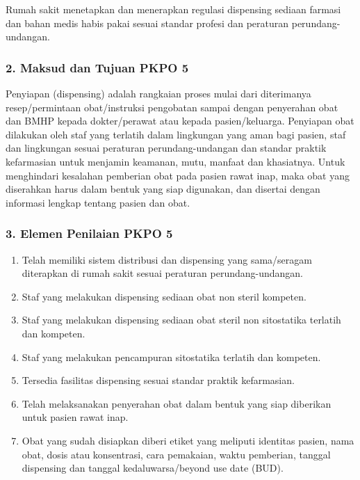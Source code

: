 \documentclass[
]{book}
\providecommand{\tightlist}{%
  \setlength{\itemsep}{0pt}\setlength{\parskip}{0pt}}
\begin{document}
Rumah sakit menetapkan dan menerapkan regulasi dispensing sediaan farmasi dan bahan medis habis pakai sesuai standar profesi dan peraturan perundang-undangan.

\hypertarget{maksud-dan-tujuan-pkpo-5}{%
\subsubsection*{2. Maksud dan Tujuan PKPO 5}\label{maksud-dan-tujuan-pkpo-5}}

Penyiapan (dispensing) adalah rangkaian proses mulai dari diterimanya resep/permintaan obat/instruksi pengobatan sampai dengan penyerahan obat dan BMHP kepada dokter/perawat atau kepada pasien/keluarga. Penyiapan obat dilakukan oleh staf yang terlatih dalam lingkungan yang aman bagi pasien, staf dan lingkungan sesuai peraturan perundang-undangan dan standar praktik kefarmasian untuk menjamin keamanan, mutu, manfaat dan khasiatnya. Untuk menghindari kesalahan pemberian obat pada pasien rawat inap, maka obat yang diserahkan harus dalam bentuk yang siap digunakan, dan disertai dengan informasi lengkap tentang pasien dan obat.

\hypertarget{elemen-penilaian-pkpo-5}{%
\subsubsection*{3. Elemen Penilaian PKPO 5}\label{elemen-penilaian-pkpo-5}}

\begin{enumerate}
\def\labelenumi{\alph{enumi}.}
\tightlist
\item
  Telah memiliki sistem distribusi dan dispensing yang sama/seragam diterapkan di rumah sakit sesuai peraturan perundang-undangan.
\item
  Staf yang melakukan dispensing sediaan obat non steril kompeten.
\item
  Staf yang melakukan dispensing sediaan obat steril non sitostatika terlatih dan kompeten.
\item
  Staf yang melakukan pencampuran sitostatika terlatih dan kompeten.
\item
  Tersedia fasilitas dispensing sesuai standar praktik kefarmasian.
\item
  Telah melaksanakan penyerahan obat dalam bentuk yang siap diberikan untuk pasien rawat inap.
\item
  Obat yang sudah disiapkan diberi etiket yang meliputi identitas pasien, nama obat, dosis atau konsentrasi, cara pemakaian, waktu pemberian, tanggal dispensing dan tanggal kedaluwarsa/beyond use date (BUD).
\end{enumerate}
\end{document}
